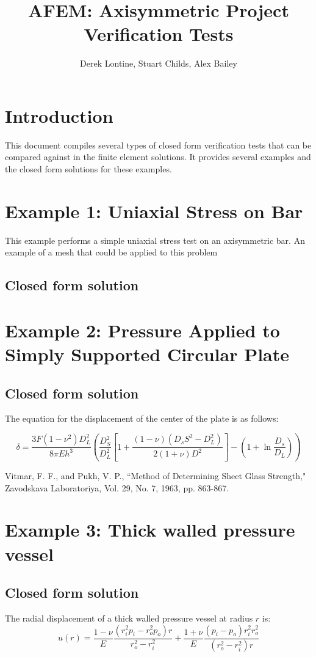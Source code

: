 \documentclass[10pt,letterpaper]{report}
\author{Derek Lontine, Stuart Childs, Alex Bailey}
\title{AFEM: Axisymmetric Project Verification Tests}
\numberwithin{equation}{chapter}
\begin{document}
\maketitle

\chapter{Introduction}
This document compiles several types of closed form verification tests that can be compared against in the finite element solutions. It provides several examples and the closed form solutions for these examples. 

\chapter{Example 1: Uniaxial Stress on Bar}
This example performs a simple uniaxial stress test on an axisymmetric bar. An example of a mesh that could be applied to this problem 

\section{Closed form solution}

\chapter{Example 2: Pressure Applied to Simply Supported Circular Plate}


\section{Closed form solution}
The equation for the displacement of the center of the plate is as follows:

\begin{equation}
\delta=
\frac{3F(1-\nu^2)D_L^2}{8\pi Eh^3}
\left(
\frac{D_S^2}{D_L^2}\left[1+
\frac{(1-\nu)(D_sS^2-D_L^2)}{2(1+\nu)D^2}\right]
-\left(1+\ln\frac{D_s}{D_L}\right)\right)
\end{equation}

Vitmar, F. F., and Pukh, V. P., ``Method of Determining Sheet Glass
Strength," Zavodskava Laboratoriya, Vol. 29, No. 7, 1963, pp.
863-867.


\chapter{Example 3: Thick walled pressure vessel}

\section{Closed form solution}
The radial displacement of a thick walled pressure vessel at radius $r$ is:
\begin{equation}
u(r)=\frac{1-\nu}{E}
\frac{(r_i^2p_i-r_o^2p_o)r}{r_o^2-r_i^2}+
\frac{1+\nu}{E}
\frac{(p_i-p_o)r_i^2r_o^2}{(r_o^2-r_i^2)r}
\end{equation}
\end{document}

